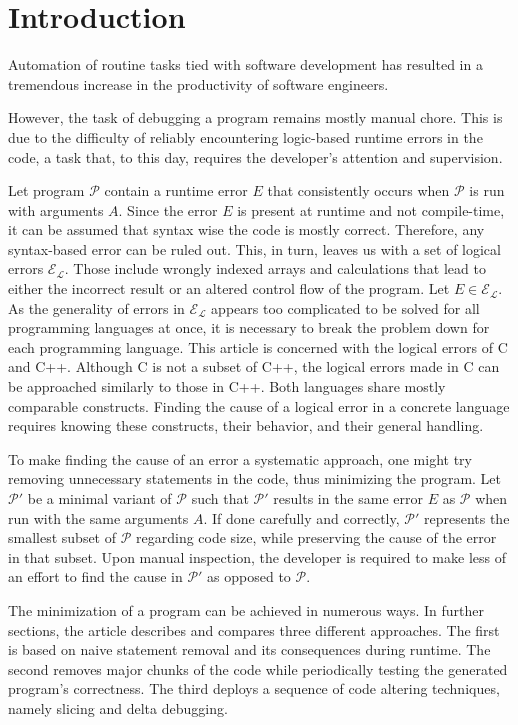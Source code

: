 \chapter*{Introduction}


Automation of routine tasks tied with software development has resulted in a tremendous
increase in the productivity of software engineers. 

However, the task of debugging a program
remains mostly manual chore. 
This is due to the difficulty of reliably encountering logic-based
runtime errors in the code, a task that, to this day, requires 
the developer's attention and supervision.

Let program $\mathcal{P}$ contain a runtime error $E$ 
that consistently occurs when $\mathcal{P}$ is run 
with arguments $A$.
Since the error $E$ is present at runtime and not compile-time,
it can be assumed that syntax wise the code is mostly correct.
Therefore, any syntax-based error can be ruled out.
This, in turn, leaves us with a set of logical errors $\mathcal{E_L}$.
Those include wrongly indexed arrays and calculations that lead to either
the incorrect result or an altered control flow of the program. 
Let $E \in \mathcal{E_L}$. As the generality of errors in $\mathcal{E_L}$
appears too complicated to be solved for all programming languages at once, 
it is necessary to break the problem down for each programming language. 
This article is concerned with the logical errors of C and C++.
Although C is not a subset of C++, the logical errors made in C can be
approached similarly to those in C++.
Both languages share mostly comparable constructs.
Finding the cause of a logical error in a concrete language requires knowing
these constructs, their behavior, and their general handling.

To make finding the cause of an error a systematic approach, one might try removing
unnecessary statements in the code, thus minimizing the program.
Let $\mathcal{P'}$ be a minimal variant of $\mathcal{P}$ such 
that $\mathcal{P'}$ results in the same error $E$ as $\mathcal{P}$
when run with the same arguments $A$.
If done carefully and correctly, $\mathcal{P'}$ represents the smallest 
subset of $\mathcal{P}$ regarding code
size, while preserving the cause of the error in that subset.
Upon manual inspection, the developer is required to make less of an effort to find
the cause in $\mathcal{P'}$ as opposed to $\mathcal{P}$.

The minimization of a program can be achieved in numerous ways.
In further sections, the article describes and compares three different approaches.
The first is based on naive statement removal and its consequences during runtime.
The second removes major chunks of the code while
periodically testing the generated program's correctness.
The third deploys a sequence of code
altering techniques, namely slicing and delta debugging.

